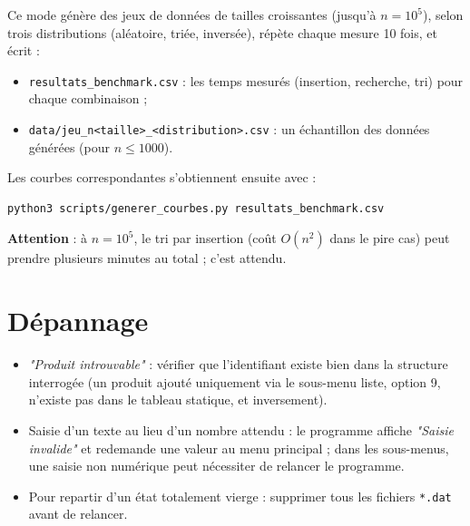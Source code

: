 \documentclass[11pt,a4paper]{article}
\begin{document}
Ce mode génère des jeux de données de tailles croissantes (jusqu'à
$n=10^5$), selon trois distributions (aléatoire, triée, inversée), répète
chaque mesure 10 fois, et écrit :
\begin{itemize}
  \item \texttt{resultats\_benchmark.csv} : les temps mesurés (insertion,
        recherche, tri) pour chaque combinaison ;
  \item \texttt{data/jeu\_n<taille>\_<distribution>.csv} : un échantillon des
        données générées (pour $n \le 1000$).
\end{itemize}

Les courbes correspondantes s'obtiennent ensuite avec :
\begin{lstlisting}
python3 scripts/generer_courbes.py resultats_benchmark.csv
\end{lstlisting}

\textbf{Attention} : à $n=10^5$, le tri par insertion (coût $O(n^2)$ dans le
pire cas) peut prendre plusieurs minutes au total ; c'est attendu.

\section{Dépannage}

\begin{itemize}
  \item \textit{"Produit introuvable"} : vérifier que l'identifiant existe
        bien dans la structure interrogée (un produit ajouté uniquement via
        le sous-menu liste, option 9, n'existe pas dans le tableau statique,
        et inversement).
  \item Saisie d'un texte au lieu d'un nombre attendu : le programme affiche
        \textit{"Saisie invalide"} et redemande une valeur au menu principal ;
        dans les sous-menus, une saisie non numérique peut nécessiter de
        relancer le programme.
  \item Pour repartir d'un état totalement vierge : supprimer tous les
        fichiers \texttt{*.dat} avant de relancer.
\end{itemize}
\end{document}
